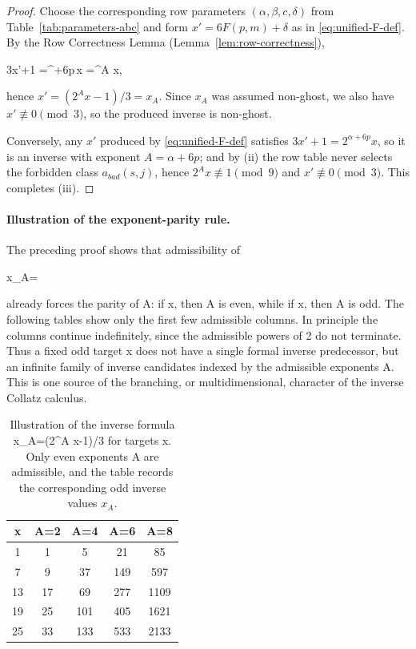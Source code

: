 \documentclass[11pt,letterpaper]{amsart}
\def\mathrm#1{#1}%
\def\({}%
\def\){}%
\def\[{ }%
\def\]{ }%
\theoremstyle{definition}
\theoremstyle{plain}
\theoremstyle{plain}
\theoremstyle{remark}
\begin{document}
\begin{proof}
Choose the corresponding row parameters $(\alpha,\beta,c,\delta)$ from
Table~\ref{tab:parameters-abc} and form $x'=6F(p,m)+\delta$ as in \eqref{eq:unified-F-def}.
By the Row Correctness Lemma (Lemma~\ref{lem:row-correctness}),
\[
3x'+1 \;=^{\alpha+6p}\,x \;=^A x,
\]
hence $x'=(2^A x-1)/3=x_A$. Since $x_A$ was assumed non-ghost, we also have
$x'\not\equiv 0\pmod 3$, so the produced inverse is non-ghost.

Conversely, any $x'$ produced by \eqref{eq:unified-F-def} satisfies
$3x'+1=2^{\alpha+6p}x$, so it is an inverse with exponent $A=\alpha+6p$; and by (ii)
the row table never selects the forbidden class $a_{\mathrm{bad}}(s,j)$, hence
$2^A x\not\equiv 1\pmod 9$ and $x'\not\equiv 0\pmod 3$. This completes (iii).
\end{proof}


\paragraph{Illustration of the exponent-parity rule.}
The preceding proof shows that admissibility of
\[
x_A=
\]
already forces the parity of \(A\): if \(x\), then \(A\)
is even, while if \(x\), then \(A\) is odd.  The following
tables show only the first few admissible columns.  In principle the
columns continue indefinitely, since the admissible powers of \(2\) do
not terminate.  Thus a fixed odd target \(x\) does not have a single
formal inverse predecessor, but an infinite family of inverse candidates
indexed by the admissible exponents \(A\).  This is one source of the
branching, or multidimensional, character of the inverse Collatz
calculus.


\begin{table}[h]
\centering
\begin{tabular}{c|cccc}
\(x\equiv 1\pmod 6\) &
\(\displaystyle A=2\) &
\(\displaystyle A=4\) &
\(\displaystyle A=6\) &
\(\displaystyle A=8\) \\
\hline
\(1\)  & \(1\)  & \(5\)   & \(21\)   & \(85\) \\
\(7\)  & \(9\)  & \(37\)  & \(149\)  & \(597\) \\
\(13\) & \(17\) & \(69\)  & \(277\)  & \(1109\) \\
\(19\) & \(25\) & \(101\) & \(405\)  & \(1621\) \\
\(25\) & \(33\) & \(133\) & \(533\)  & \(2133\)
\end{tabular}
\caption{Illustration of the inverse formula
\(\displaystyle x_A=(2^A x-1)/3\) for targets \(x\).
Only even exponents \(A\) are admissible, and the table records the
corresponding odd inverse values $x_A$.}
\label{tab:inverse-parity-even-family}
\end{table}
\end{document}
